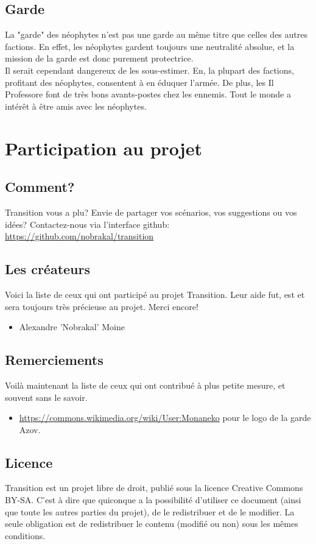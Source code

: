 \documentclass{book}
\begin{document}
\subsection{Garde}
La "garde" des néophytes n'est pas une garde au même titre que celles des autres factions. En effet, les néophytes gardent toujours une neutralité absolue, et la mission de la garde est donc purement protectrice.
\\
Il serait cependant dangereux de les sous-estimer. En, la plupart des factions, profitant des néophytes, consentent à en éduquer l'armée. De plus, les Il Professore font de très bons avants-postes chez les ennemis. Tout le monde a intérêt à être amis avec les néophytes.


\newpage
\section{Participation au projet}
\subsection{Comment?}
\hypertarget{participation}{}
Transition vous a plu? 
Envie de partager vos scénarios, vos suggestions ou vos idées?
\newline
Contactez-nous via l'interface github: \href {https://github.com/nobrakal/transition} {https://github.com/nobrakal/transition}
\subsection{Les créateurs}
Voici la liste de ceux qui ont participé au projet Transition. Leur aide fut, est et sera toujours très précieuse au projet. Merci encore!  
\begin{itemize}
\item Alexandre ’Nobrakal’ Moine 
\end{itemize}
\subsection{Remerciements}
Voilà maintenant la liste de ceux qui ont contribué à plus petite mesure, et souvent sans le savoir. 
\begin{itemize}
	\item \url{https://commons.wikimedia.org/wiki/User:Monaneko} pour le logo de la garde Azov.
\end{itemize}
\subsection{Licence}
Transition est un projet libre de droit, publié sous la licence Creative Commons BY-SA. C'est à dire que quiconque a la possibilité d'utiliser ce document (ainsi que toute les autres parties du projet), de le redistribuer et de le modifier. La seule obligation est de redistribuer le contenu (modifié ou non) sous les mêmes conditions.
\end{document}
